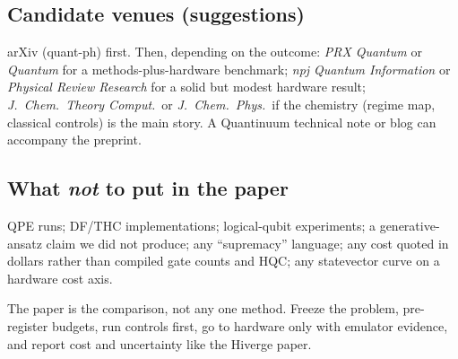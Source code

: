 \documentclass[11pt,a4paper]{article}
\newcommand{\takeaway}[1]{\par\smallskip\noindent{\bfseries\textcolor{keyblue}{Takeaway.}} #1\par\smallskip}
\begin{document}
\subsection{Candidate venues (suggestions)}
arXiv (quant-ph) first. Then, depending on the outcome: \emph{PRX Quantum} or \emph{Quantum} for a methods-plus-hardware benchmark; \emph{npj Quantum Information} or \emph{Physical Review Research} for a solid but modest hardware result; \emph{J.~Chem.\ Theory Comput.}\ or \emph{J.~Chem.\ Phys.}\ if the chemistry (regime map, classical controls) is the main story. A Quantinuum technical note or blog can accompany the preprint.

\subsection{What \emph{not} to put in the paper}
QPE runs; DF/THC implementations; logical-qubit experiments; a generative-ansatz claim we did not produce; any ``supremacy'' language; any cost quoted in dollars rather than compiled gate counts and HQC; any statevector curve on a hardware cost axis.

\takeaway{The paper is the comparison, not any one method. Freeze the problem, pre-register budgets, run controls first, go to hardware only with emulator evidence, and report cost and uncertainty like the Hiverge paper.}

\clearpage
\end{document}
